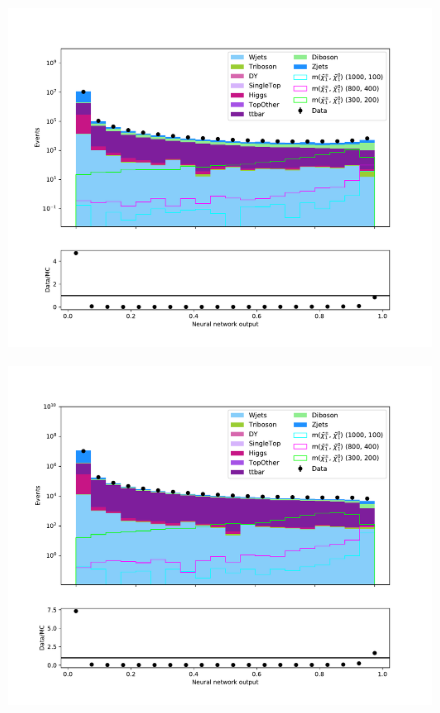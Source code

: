 \begin{figure}[H]
    \centering
        \includegraphics[width = \textwidth]{Figures/Stacked/stackedplot_NN_Low_level_slepsnu.pdf}
        \caption{}
        \label{fig:traintestscaled}
\end{figure}

\begin{figure}[H]
    \centering
        \includegraphics[width = \textwidth]{Figures/Stacked/stackedplot_NN_High_level_slepsnu.pdf}
        \caption{}
        \label{fig:traintestscaled}
\end{figure}








